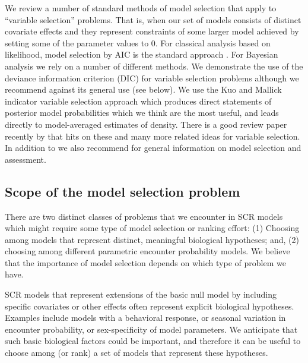 We review a number of standard methods of model selection that apply
to ``variable selection'' problems. That is, when our set of models
consists of distinct covariate effects and they represent constraints
of some larger model achieved by setting some of the parameter values
to 0.  %
For classical analysis based on likelihood, model selection by
AIC is the standard approach \citep{burnham_anderson:2002}.  For
Bayesian analysis we rely on a number of different methods.  We
demonstrate the use of the deviance information criterion (DIC)
\citep{spiegelhalter_etal:2002} for variable selection problems
although we recommend against its general use (see below).  We use the
Kuo and Mallick indicator variable selection approach
\citep{kuo_mallick:1998} which
produces direct statements
of posterior model probabilities which we think are the most useful,
and leads directly to model-averaged estimates of density.  There is a
good review paper recently by \citet{ohara_sillanpaa:2009} that hits
on these and many more related ideas for variable selection.
 In addition to \citet{ohara_sillanpaa:2009} we
also recommend \citet[][Chapt. 7]{link_barker:2010} for general
information on model selection and assessment.
\begin{comment} %
  We have not done a comprehensive evaluation of different methods for
  effect and efficiency.
\end{comment}

\subsection{Scope of the model selection problem}

There are two distinct classes of problems that we encounter in SCR
models which might require some type of model selection or ranking
effort: (1) Choosing among models that represent distinct, meaningful
biological hypotheses; and, (2) choosing among different parametric
encounter probability models. We believe that the importance of model
selection depends on which type of problem we have.

{}
SCR models that represent extensions of the basic null model by
including specific covariates or other effects often represent
explicit biological hypotheses. Examples include models with a
behavioral response, or seasonal variation in encounter probability,
or sex-specificity of model parameters.
We anticipate that such basic biological factors
could be important, and therefore it can be useful to choose among (or
rank) a set of models that represent these hypotheses.


